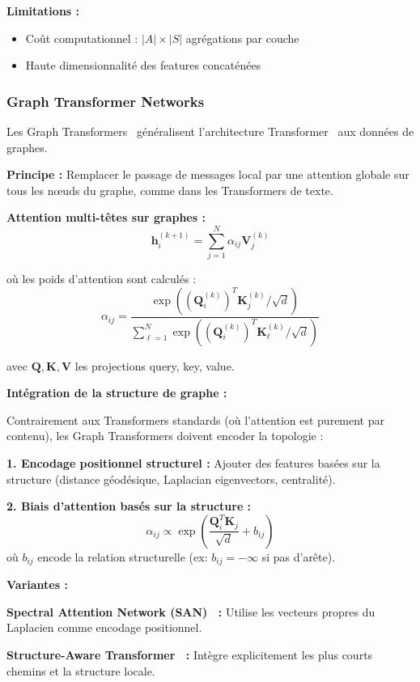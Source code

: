 \textbf{Limitations :}
\begin{itemize}
    \item Coût computationnel : $|A| \times |S|$ agrégations par couche
    \item Haute dimensionnalité des features concaténées
\end{itemize}

\subsubsection{Graph Transformer Networks}

Les Graph Transformers~\cite{Dwivedi2021,Rampasek2023} généralisent l'architecture Transformer~\cite{Vaswani2017} aux données de graphes.

\textbf{Principe :}
Remplacer le passage de messages local par une attention globale sur tous les nœuds du graphe, comme dans les Transformers de texte.

\textbf{Attention multi-têtes sur graphes :}
\[
\mathbf{h}_i^{(k+1)} = \sum_{j=1}^N \alpha_{ij} \mathbf{V}_j^{(k)}
\]

où les poids d'attention sont calculés :
\[
\alpha_{ij} = \frac{\exp((\mathbf{Q}_i^{(k)})^T \mathbf{K}_j^{(k)} / \sqrt{d})}{\sum_{\ell=1}^N \exp((\mathbf{Q}_i^{(k)})^T \mathbf{K}_\ell^{(k)} / \sqrt{d})}
\]

avec $\mathbf{Q}, \mathbf{K}, \mathbf{V}$ les projections query, key, value.

\textbf{Intégration de la structure de graphe :}

Contrairement aux Transformers standards (où l'attention est purement par contenu), les Graph Transformers doivent encoder la topologie :

\textbf{1. Encodage positionnel structurel :}
Ajouter des features basées sur la structure (distance géodésique, Laplacian eigenvectors, centralité).

\textbf{2. Biais d'attention basés sur la structure :}
\[
\alpha_{ij} \propto \exp\left(\frac{\mathbf{Q}_i^T \mathbf{K}_j}{\sqrt{d}} + b_{ij}\right)
\]
où $b_{ij}$ encode la relation structurelle (ex: $b_{ij} = -\infty$ si pas d'arête).

\textbf{Variantes :}

\textbf{Spectral Attention Network (SAN)~\cite{Kreuzer2021} :}
Utilise les vecteurs propres du Laplacien comme encodage positionnel.

\textbf{Structure-Aware Transformer~\cite{Chen2022} :}
Intègre explicitement les plus courts chemins et la structure locale.

